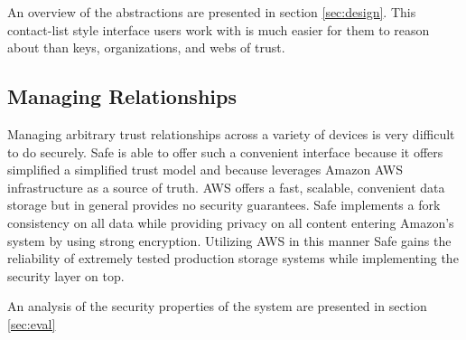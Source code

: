 An overview of the abstractions are presented in section \ref{sec:design}. This contact-list style interface users work with is much easier for them to reason about than keys, organizations, and webs of trust.

\subsection{Managing Relationships}
Managing arbitrary trust relationships across a variety of devices is very difficult to do securely. Safe is able to offer such a convenient interface because it offers simplified a simplified trust model and because leverages Amazon AWS infrastructure as a source of truth. AWS offers a fast, scalable, convenient data storage but in general provides no security guarantees. 
Safe implements a fork consistency on all data while providing privacy on all content entering Amazon's system by using strong encryption. Utilizing AWS in this manner Safe gains the reliability of extremely tested production storage systems while implementing the security layer on top.

An analysis of the security properties of the system are presented in section \ref{sec:eval}